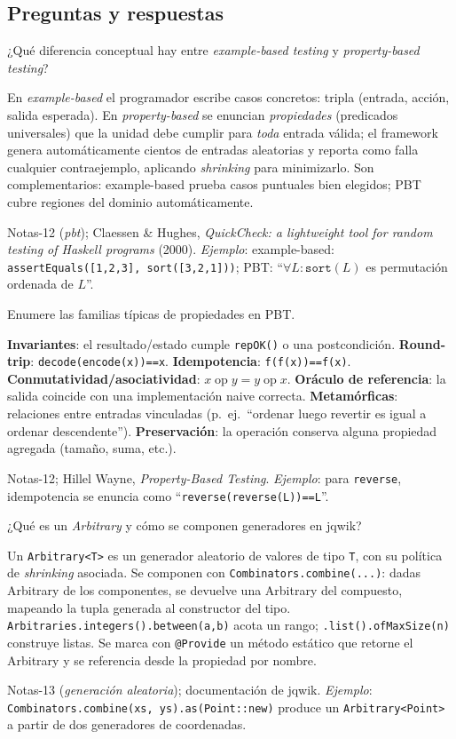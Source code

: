 \documentclass[11pt,a4paper]{article}
\newcounter{preg}
\newcommand{\qa}[3]{%
  \stepcounter{preg}%
  \vspace{0.4em}
  \begin{preguntabox}{\thepreg}
  #1
  \end{preguntabox}
  \begin{respuestabox}
  #2
  \end{respuestabox}
  \begin{refbox}
  #3
  \end{refbox}
  \vspace{0.6em}
}
\begin{document}
\subsection*{Preguntas y respuestas}

\qa{¿Qué diferencia conceptual hay entre \emph{example-based testing} y \emph{property-based testing}?}
{En \emph{example-based} el programador escribe casos concretos: tripla (entrada, acción, salida esperada). En \emph{property-based} se enuncian \emph{propiedades} (predicados universales) que la unidad debe cumplir para \emph{toda} entrada válida; el framework genera automáticamente cientos de entradas aleatorias y reporta como falla cualquier contraejemplo, aplicando \emph{shrinking} para minimizarlo. Son complementarios: example-based prueba casos puntuales bien elegidos; PBT cubre regiones del dominio automáticamente.}
{Notas-12 (\emph{pbt}); Claessen \& Hughes, \emph{QuickCheck: a lightweight tool for random testing of Haskell programs} (2000). \emph{Ejemplo}: example-based: \texttt{assertEquals([1,2,3], sort([3,2,1]))}; PBT: ``$\forall L: \texttt{sort}(L)$ es permutación ordenada de $L$''.}

\qa{Enumere las familias típicas de propiedades en PBT.}
{\textbf{Invariantes}: el resultado/estado cumple \texttt{repOK()} o una postcondición. \textbf{Round-trip}: \texttt{decode(encode(x))==x}. \textbf{Idempotencia}: \texttt{f(f(x))==f(x)}. \textbf{Conmutatividad/asociatividad}: $x \mathbin{\text{op}} y = y \mathbin{\text{op}} x$. \textbf{Oráculo de referencia}: la salida coincide con una implementación naive correcta. \textbf{Metamórficas}: relaciones entre entradas vinculadas (p.~ej.\ ``ordenar luego revertir es igual a ordenar descendente''). \textbf{Preservación}: la operación conserva alguna propiedad agregada (tamaño, suma, etc.).}
{Notas-12; Hillel Wayne, \emph{Property-Based Testing}. \emph{Ejemplo}: para \texttt{reverse}, idempotencia se enuncia como ``\texttt{reverse(reverse(L))==L}''.}

\qa{¿Qué es un \emph{Arbitrary} y cómo se componen generadores en jqwik?}
{Un \texttt{Arbitrary<T>} es un generador aleatorio de valores de tipo \texttt{T}, con su política de \emph{shrinking} asociada. Se componen con \texttt{Combinators.combine(...)}: dadas Arbitrary de los componentes, se devuelve una Arbitrary del compuesto, mapeando la tupla generada al constructor del tipo. \texttt{Arbitraries.integers().between(a,b)} acota un rango; \texttt{.list().ofMaxSize(n)} construye listas. Se marca con \texttt{@Provide} un método estático que retorne el Arbitrary y se referencia desde la propiedad por nombre.}
{Notas-13 (\emph{generación aleatoria}); documentación de jqwik. \emph{Ejemplo}: \texttt{Combinators.combine(xs, ys).as(Point::new)} produce un \texttt{Arbitrary<Point>} a partir de dos generadores de coordenadas.}
\end{document}
